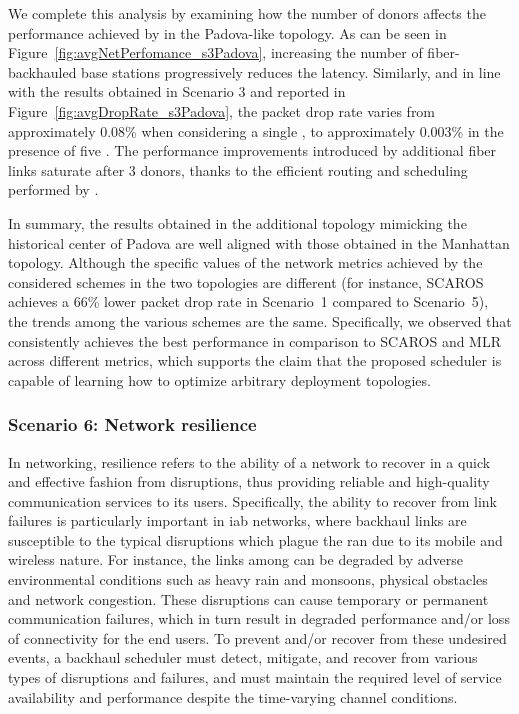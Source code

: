 We complete this analysis by examining how the number of donors affects the performance achieved by \name{} in the Padova-like topology. 
As can be seen in Figure~\ref{fig:avgNetPerfomance_s3Padova}, increasing the number of fiber-backhauled base stations progressively reduces the latency. Similarly, and in line with the results obtained in Scenario 3 and reported in Figure~\ref{fig:avgDropRate_s3Padova}, the packet drop rate varies from approximately 0.08\% when considering a single \donor{}, to approximately 0.003\% in the presence of five \donors{}. The performance improvements introduced by additional fiber links saturate after 3 donors, thanks to the efficient routing and scheduling performed by \name{}.

In summary, the results obtained in the additional topology mimicking the historical center of Padova are well aligned with those obtained in the Manhattan topology. Although the specific values of the network metrics achieved by the considered schemes in the two topologies are different (for instance, SCAROS achieves a 66\% lower packet drop rate in Scenario~1 compared to Scenario~5), the trends among the various schemes are the same. Specifically, we observed that \name{} consistently achieves the best performance in comparison to SCAROS and MLR across different metrics, which supports the claim that the proposed scheduler is capable of learning how to optimize arbitrary deployment topologies.

\subsubsection*{Scenario 6: Network resilience}
In networking, resilience refers to the ability of a network to recover in a quick and effective fashion from disruptions, thus providing reliable and high-quality communication services to its users.
Specifically, the ability to recover from link failures is particularly important in \gls{iab} networks, where backhaul links are susceptible to the typical disruptions which plague the \gls{ran} due to its mobile and wireless nature. For instance, the links among \nodes{} can be degraded by adverse environmental conditions such as heavy rain and monsoons, physical obstacles and network congestion. These disruptions can cause temporary or permanent communication failures, which in turn result in degraded performance and/or loss of connectivity for the end users. 
To prevent and/or recover from these undesired events, a backhaul scheduler must detect, mitigate, and recover from various types of disruptions and failures, and must maintain the required level of service availability and performance despite the time-varying channel conditions.

